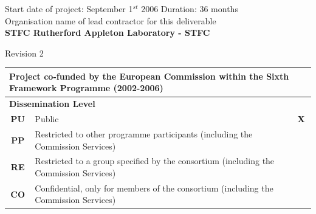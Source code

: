 \documentclass[a4paper,11pt]{article}
\begin{document}
\vspace*{\baselineskip}\noindent
{Start date of project: September 1$^{st}$} 2006 \hfill {Duration: 36 months}\\

\vspace{2\baselineskip}\noindent
Organisation name of lead contractor for this deliverable\\
{\bf STFC Rutherford Appleton Laboratory - STFC}
\begin{flushright} 
Revision 2
\end{flushright}

\vspace{\baselineskip}
\begin{table}[hb]
\begin{tabular}{||c|l|l||} \hline\hline
\multicolumn{3}{||l||}{\small Project co-funded by the European Commission within the Sixth Framework Programme (2002-2006)}\\ \hline
\multicolumn{3}{||l||}{\bf Dissemination Level}\\ \hline
\bf PU &\small Public\hfill~& \bf X \\ \hline
\bf PP &\small Restricted to other programme participants (including the Commission Services)& \\ \hline 
\bf RE &\small Restricted to a group specified by the consortium (including the Commission Services)&  \\ \hline
\bf CO &\small Confidential, only for members of the consortium (including the Commission Services)&  \\ \hline \hline
\end{tabular}
\end{table}
\pagebreak

\tableofcontents
\pagebreak
\end{document}
